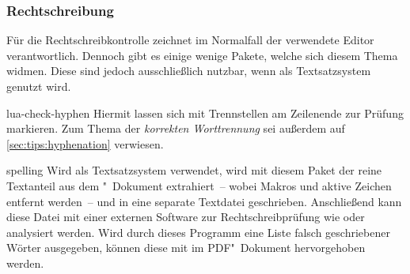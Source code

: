 \subsubsection{Rechtschreibung}
%
%
Für die Rechtschreibkontrolle zeichnet im Normalfall der verwendete Editor 
verantwortlich. Dennoch gibt es einige wenige Pakete, welche sich diesem Thema 
widmen. Diese sind jedoch ausschließlich nutzbar, wenn als Textsatzsystem 
 genutzt wird.
\begin{packages}
\item[lua-check-hyphen]
  Hiermit lassen sich mit  Trennstellen am Zeilenende zur 
  Prüfung markieren. Zum Thema der \textit{korrekten Worttrennung} sei außerdem 
  auf \autoref{sec:tips:hyphenation} verwiesen.
\item[spelling]
  Wird  als Textsatzsystem verwendet, wird mit diesem Paket 
  der reine Textanteil aus dem "~Dokument extrahiert~-- wobei 
  Makros und aktive Zeichen entfernt werden~-- und in eine separate Textdatei 
  geschrieben. Anschließend kann diese Datei mit einer externen Software zur 
  Rechtschreibprüfung wie  oder  
  analysiert werden. Wird durch dieses Programm eine Liste falsch geschriebener 
  Wörter ausgegeben, können diese mit  im PDF"~Dokument 
  hervorgehoben werden.
%
\end{packages}


